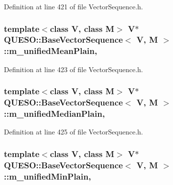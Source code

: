 Definition at line 421 of file Vector\-Sequence.\-h.

\hypertarget{class_q_u_e_s_o_1_1_base_vector_sequence_a0bb5f2fa3d8369412b8cf5f6795b95b4}{
\subsubsection[{m\-\_\-unified\-Mean\-Plain}]{\setlength{\rightskip}{0pt plus 5cm}template$<$class V, class M$>$ V$\ast$ {\bf Q\-U\-E\-S\-O\-::\-Base\-Vector\-Sequence}$<$ V, M $>$\-::m\-\_\-unified\-Mean\-Plain\hspace{0.3cm}{\ttfamily [mutable]}, {\ttfamily [protected]}}}\label{class_q_u_e_s_o_1_1_base_vector_sequence_a0bb5f2fa3d8369412b8cf5f6795b95b4}


Definition at line 423 of file Vector\-Sequence.\-h.

\hypertarget{class_q_u_e_s_o_1_1_base_vector_sequence_ac723ac11f629ba07915f7520b36e4138}{
\subsubsection[{m\-\_\-unified\-Median\-Plain}]{\setlength{\rightskip}{0pt plus 5cm}template$<$class V, class M$>$ V$\ast$ {\bf Q\-U\-E\-S\-O\-::\-Base\-Vector\-Sequence}$<$ V, M $>$\-::m\-\_\-unified\-Median\-Plain\hspace{0.3cm}{\ttfamily [mutable]}, {\ttfamily [protected]}}}\label{class_q_u_e_s_o_1_1_base_vector_sequence_ac723ac11f629ba07915f7520b36e4138}


Definition at line 425 of file Vector\-Sequence.\-h.

\hypertarget{class_q_u_e_s_o_1_1_base_vector_sequence_a8401f459127618bbdcb0826ddb69b550}{
\subsubsection[{m\-\_\-unified\-Min\-Plain}]{\setlength{\rightskip}{0pt plus 5cm}template$<$class V, class M$>$ V$\ast$ {\bf Q\-U\-E\-S\-O\-::\-Base\-Vector\-Sequence}$<$ V, M $>$\-::m\-\_\-unified\-Min\-Plain\hspace{0.3cm}{\ttfamily [mutable]}, {\ttfamily [protected]}}}\label{class_q_u_e_s_o_1_1_base_vector_sequence_a8401f459127618bbdcb0826ddb69b550}


